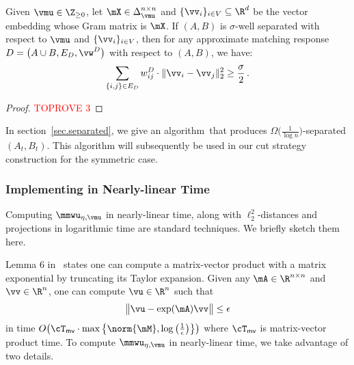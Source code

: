 \documentclass[letterpaper]{article}
\begin{document}
\begin{lemma}
\label{lem.sym-cut-strat.loss}
Given $\vmu \in \Z_{\geq 0}$, let $\mX \in \Delta_{\vmu}^{n \times n}$ and $\{ \vv_i \}_{i \in V} \subseteq \R^d$ be the vector embedding whose Gram matrix is $\mX$. If $(A, B)$ is $\sigma$-well separated with respect to $\vmu$ and $\{ \vv_i \}_{i \in V}$, then for any approximate matching response $D = \big( A \cup B, E_D, \vw^D \big)$ with respect to $(A, B)$, we have:
\begin{equation*}
\sum_{\{ i, j \} \in E_D} w_{ij}^{D} \cdot \lVert \vv_i - \vv_j \rVert_2^2
\geq {\sigma \over 2} \, .
\end{equation*}
\end{lemma}
\begin{proof}\textcolor{red}{TOPROVE 3}\end{proof}

In section~\ref{sec.separated}, we give an algorithm~\roundcut that produces $\Omega\big( \frac{1}{\log n} \big)$-separated $(A_t, B_t)$. This algorithm will subsequently be used in our cut strategy construction for the symmetric case.


\subsubsection{Implementing \mmwu in Nearly-linear Time}
\label{sec.alg-cm.sym-cut-strat.nearly-linear-mmwu}

Computing $\mmwu_{\eta, \vmu}$ in nearly-linear time, along with $\ell_2^2$-distances and projections in logarithmic time are standard techniques. We briefly sketch them here.

Lemma 6 in~\cite{arora2007combinatorial} states one can compute a matrix-vector product with a matrix exponential by truncating its Taylor expansion. Given any $\mA \in \R^{n \times n}$ and $\vv \in \R^n$, one can compute $\vu \in \R^n$ such that
\begin{equation*}
\big\lVert \vu - \exp(\mA)\vv \big\rVert \leq \epsilon
\end{equation*}
in time $O \big( \cT_{\textsf{mv}} \cdot \max \big\{ \norm{\mM}, \log \big(\frac{1}{\epsilon} \big) \big\} \big)$ where $\cT_{\textsf{mv}}$ is matrix-vector product time. To compute $\mmwu_{\eta, \vmu}$ in nearly-linear time, we take advantage of two details.
\end{document}
